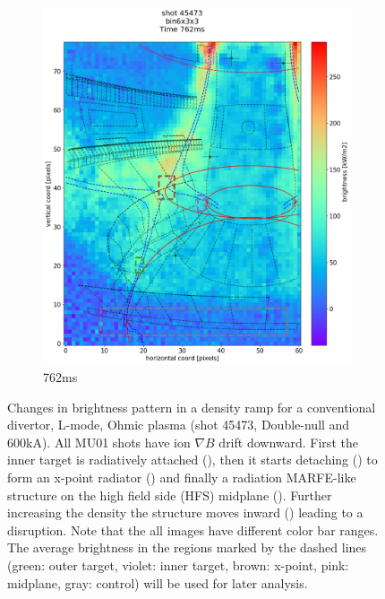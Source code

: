 \begin{figure}
\begin{subfigure}{0.4\linewidth}
         \includegraphics[trim={5 45 0 80},clip,width=\textwidth]{Chapters/chapter2/figs/IRVB-MASTU_shot-45473_export_38.png}
         \vspace*{-6.5mm}
         \caption{762ms}
         \label{fig:45473_export_5}
     \end{subfigure}
    \vspace*{-3mm}
    \caption{Changes in brightness pattern in a density ramp for a conventional divertor, L-mode, Ohmic plasma (shot 45473, Double-null and 600kA). All MU01 shots have ion $\nabla B$ drift downward. First the inner target is radiatively attached (), then it starts detaching () to form an x-point radiator () and finally a radiation MARFE-like structure on the high field side (HFS) midplane (). Further increasing the density the structure moves inward () leading to a disruption. Note that the all images have different color bar ranges. The average brightness in the regions marked by the dashed lines (green: outer target, violet: inner target, brown: x-point, pink: midplane, gray: control) will be used for later analysis.}
    \label{fig:45473_export}
\end{figure}

